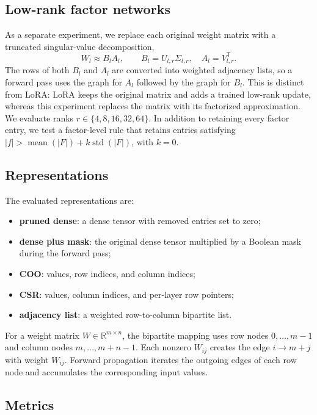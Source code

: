 \documentclass[11pt]{article}
\begin{document}
\subsection{Low-rank factor networks}

As a separate experiment, we replace each original weight matrix with a
truncated singular-value decomposition,
\[
    W_l \approx B_l A_l,
    \qquad B_l=U_{l,r}\Sigma_{l,r},\quad A_l=V_{l,r}^{\mathsf T}.
\]
The rows of both $B_l$ and $A_l$ are converted into weighted adjacency lists,
so a forward pass uses the graph for $A_l$ followed by the graph for $B_l$.
This is distinct from LoRA: LoRA keeps the original matrix and adds a trained
low-rank update, whereas this experiment replaces the matrix with its
factorized approximation.  We evaluate ranks $r\in\{4,8,16,32,64\}$.  In
addition to retaining every factor entry, we test a factor-level rule that
retains entries satisfying
$|f|>\operatorname{mean}(|F|)+k\operatorname{std}(|F|)$, with $k=0$.

\subsection{Representations}

The evaluated representations are:
\begin{itemize}
    \item \textbf{pruned dense}: a dense tensor with removed entries set to
    zero;
    \item \textbf{dense plus mask}: the original dense tensor multiplied by a
    Boolean mask during the forward pass;
    \item \textbf{COO}: values, row indices, and column indices;
    \item \textbf{CSR}: values, column indices, and per-layer row pointers;
    \item \textbf{adjacency list}: a weighted row-to-column bipartite list.
\end{itemize}

For a weight matrix $W\in\mathbb{R}^{m\times n}$, the bipartite mapping uses
row nodes $0,\ldots,m-1$ and column nodes $m,\ldots,m+n-1$.  Each nonzero
$W_{ij}$ creates the edge $i\rightarrow m+j$ with weight $W_{ij}$.  Forward
propagation iterates the outgoing edges of each row node and accumulates the
corresponding input values.

\subsection{Metrics}
\end{document}
